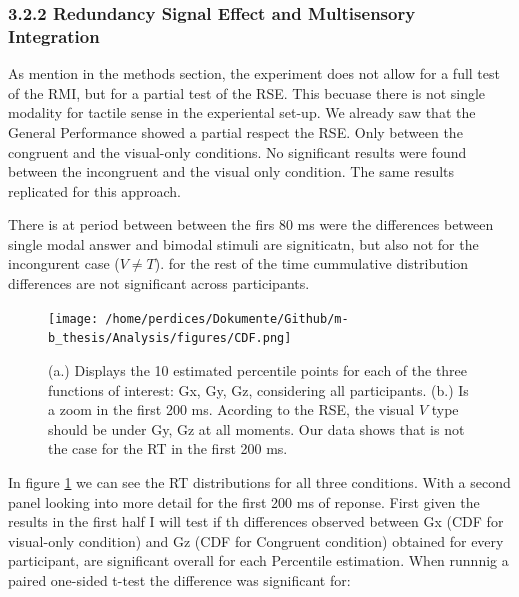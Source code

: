 \documentclass[12pt,oneside,openright]{report}
\begin{document}
\subsubsection*{3.2.2 Redundancy Signal Effect and Multisensory Integration}

As mention in the methods section, the experiment does not allow for a full test of the RMI, but for a partial test of the RSE. This becuase there is not single modality for tactile sense in the experiental set-up. We already saw that the General Performance showed a partial respect the RSE. Only between the congruent and the visual-only conditions. No significant results were found between the incongruent and the visual only condition. The same results replicated for this approach. 

There is at period between between the firs 80 ms were the differences between single modal answer and bimodal stimuli are signiticatn, but also not for the incongurent case ($V \neq T$). for the rest of the time cummulative distribution differences are not significant across participants. 

\begin{figure}[!ht]
    \centering
    \texttt{[image: /home/perdices/Dokumente/Github/m-b\_thesis/Analysis/figures/CDF.png]}
    \caption{ (a.) Displays the 10 estimated percentile points for each of the three functions of interest: Gx, Gy, Gz, considering all participants. (b.) Is a zoom in the first 200 ms. Acording to the RSE, the visual $V$ type should be under Gy, Gz at all moments. Our data shows that is not the case for the RT in the first 200 ms.}
    \label{fig:CDF}
\end{figure}

In figure \ref{fig:CDF} we can see the RT distributions for all three conditions. With a second panel looking into more detail for the first 200 ms of reponse. First given the results in the first half I will test if th differences observed between Gx (CDF for visual-only condition) and Gz (CDF for Congruent condition) obtained for every participant, are significant overall for each Percentile estimation. When runnnig a paired one-sided t-test the difference  was significant for:
\end{document}

